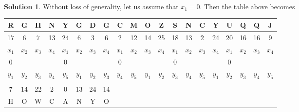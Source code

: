 \documentclass[11pt]{article}
\theoremstyle{definition}\newtheorem{definition}{Definition}
\theoremstyle{definition}\newtheorem{question}{Question}
\theoremstyle{definition}\newtheorem*{solution}{Solution}
\begin{document}
\begin{solution}
    Without loss of generality, let us assume that $x_1 = 0$. Then the table above becomes
    \begin{center}
        \begin{tabular}{|cccccccccccccccccccc|}
            \hline
            R     & G     & H     & N                          & \multicolumn{1}{c|}{Y}     & G     & D     & G                          & C     & \multicolumn{1}{c|}{M}     & O     & Z                          & S     & N     & \multicolumn{1}{c|}{C}     & Y                          & U     & Q     & Q     & J     \\ \hline
            17    & 6     & 7     & 13                         & 24                         & 6     & 3     & 6                          & 2     & 12                         & 14    & 25                         & 18    & 13    & 2                          & 24                         & 20    & 16    & 16    & 9     \\ \hline
            $x_1$ & $x_2$ & $x_3$ & \multicolumn{1}{c|}{$x_4$} & $x_1$                      & $x_2$ & $x_3$ & \multicolumn{1}{c|}{$x_4$} & $x_1$ & $x_2$                      & $x_3$ & \multicolumn{1}{c|}{$x_4$} & $x_1$ & $x_2$ & $x_3$                      & \multicolumn{1}{c|}{$x_4$} & $x_1$ & $x_2$ & $x_3$ & $x_4$ \\ \hline
            0     &       &       & \multicolumn{1}{c|}{}      & 0                          &       &       & \multicolumn{1}{c|}{}      & 0     &                            &       & \multicolumn{1}{c|}{}      & 0     &       &                            & \multicolumn{1}{c|}{}      & 0     &       &       &       \\ \hline
            $y_1$ & $y_2$ & $y_3$ & $y_4$                      & \multicolumn{1}{c|}{$y_5$} & $y_1$ & $y_2$ & $y_3$                      & $y_4$ & \multicolumn{1}{c|}{$y_5$} & $y_1$ & $y_2$                      & $y_3$ & $y_4$ & \multicolumn{1}{c|}{$y_5$} & $y_1$                      & $y_2$ & $y_3$ & $y_4$ & $y_5$ \\ \hline
                  &       &       &                            & \multicolumn{1}{c|}{}      &       &       &                            &       & \multicolumn{1}{c|}{}      &       &                            &       &       & \multicolumn{1}{c|}{}      &                            &       &       &       &       \\ \hline
            7     & 14    & 22    & 2                          & \multicolumn{1}{c|}{0}     & 13    & 24    & \multicolumn{1}{c|}{14}    &       &                            &       &                            &       &       &                            &                            &       &       &       &       \\ \cline{1-8}
            H     & O     & W     & C                          & \multicolumn{1}{c|}{A}     & N     & Y     & \multicolumn{1}{c|}{O}     &       &                            &       &                            &       &       &                            &                            &       &       &       &       \\ \hline
            \end{tabular}
        \end{center}


\end{solution}
\end{document}
